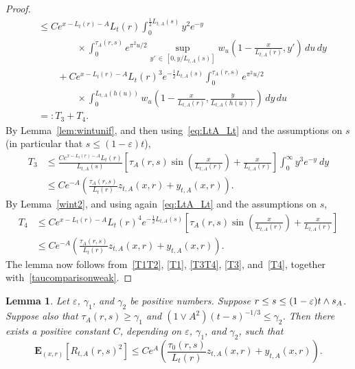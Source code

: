 \documentclass[10pt]{amsart}
\newtheorem{lemm}[theo]{Lemma}\newtheorem{prop}[theo]{Proposition}\newtheorem{coro}[theo]{Corollary}\newtheorem{conj}[theo]{Conjecture}
\theoremstyle{definition}\newtheorem{defi}[theo]{Definition}\newtheorem{rema}[theo]{Remark}\newtheorem{exam}[theo]{Example}\newtheorem{exem}[theo]{Example}\newtheorem{nota}[theo]{Notation}
\newcommand*\eps{\varepsilon}
\newcommand*\E{\mathbf{E}}
\newcommand{\1} {\mathds{1}}
\begin{document}
\begin{proof}
\begin{equation}
\begin{split}
&\leq Ce^{x-L_t(r)-A} L_t(r) \int_0^{\frac{1}{2} L_{t,A}(s)} y^2 e^{-y}\\
&\qquad\qquad\times \int_0^{\tau_A(r,s)} e^{\pi^2 u/2} \sup_{y'\,\in\,\left[0, y/L_{t,A}(s)\right]} w_u\left(1-\frac{x}{L_{t,A}(r)}, y' \right)\,du \,dy \\
&\qquad+ Ce^{x-L_t(r)-A} L_t(r)^3 e^{-\frac{1}{2} L_{t,A}(s)} \int_0^{\tau_A(r,s)} e^{\pi^2 u/2} \\
&\qquad \qquad \times \int_0^{L_{t,A}(h(u))} w_u \left(1-\frac{x}{L_{t,A}(r)}, \frac{y}{L_{t,A}(h(u))}\right)\,dy \,du\\
&=: T_3 + T_4.
\end{split}
\end{equation}
By Lemma~\ref{lem:wintunif}, and then using~\eqref{eq:LtA_Lt} and the assumptions on $s$ (in particular that $s \leq (1 - \eps)t$),
\begin{equation}\label{T3}
\begin{split}
T_3 &\leq \frac{C e^{x - L_t(r) - A} L_t(r)}{L_{t,A}(s)} \left[\tau_A(r,s) \sin\left(\frac{x}{L_{t,A}(r)}\right) + \frac x {L_{t,A}(r)}\right] \int_0^{\infty} y^3 e^{-y} \: dy \\
&\leq C e^{-A} \left(\frac{\tau_A(r,s)}{L_t(r)} z_{t,A}(x,r) + y_{t,A}(x,r)\right).
\end{split}
\end{equation}
By Lemma~\ref{wint2}, and using again~\eqref{eq:LtA_Lt} and the assumptions on $s$,
\begin{equation}\label{T4}
\begin{split}
T_4 &\leq Ce^{x-L_t(r)-A} L_t(r)^4 e^{-\frac{1}{2} L_{t,A}(s)} \left[\tau_A(r,s) \sin\left(\frac{x}{L_{t,A}(r)}\right) + \tfrac x {L_{t,A}(r)}\right]\\
&\leq C e^{-A} \left(\frac{\tau_A(r,s)}{L_t(r)} z_{t,A}(x,r) + y_{t,A}(x,r)\right).
\end{split}
\end{equation}
The lemma now follows from~\eqref{T1T2}, \eqref{T1}, \eqref{T3T4}, \eqref{T3}, and~\eqref{T4}, together with~\eqref{taucomparisonweak}.
\end{proof}

\begin{lemm}\label{lem:Rvar}
Let $\eps$, $\gamma_1$, and $\gamma_2$ be positive numbers. Suppose $r \le s \leq \linebreak(1 - \eps) t\wedge s_A$. Suppose also that $\tau_A(r,s) \geq \gamma_1$ and $(1 \vee A^2)(t - s)^{-1/3} \leq \gamma_2$. Then there exists a positive constant $C$, depending on $\eps$, $\gamma_1$, and $\gamma_2$, such that
\[
\E_{(x,r)}\left[R_{t,A}(r,s)^2\right] \le Ce^A\left(\frac{\tau_0(r,s)}{L_t(r)} z_{t,A}(x,r) + y_{t,A}(x,r)\right).
\]
\end{lemm}
\end{document}
